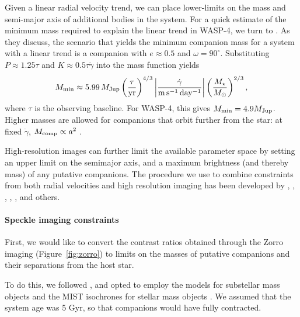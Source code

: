 \documentclass[12pt,twocolumn,tighten]{aastex62}
\begin{document}
Given a linear radial velocity trend, we can place lower-limits on the
mass and semi-major axis of additional bodies in the system.  For a
quick estimate of the minimum mass required to explain the linear
trend in WASP-4, we turn to \citet{feng_california_2015}.  As they
discuss, the scenario that yields the minimum companion mass for a
system with a linear trend is a companion with $e\approx0.5$ and
$\omega=90^\circ$.  Substituting $P\approx 1.25\tau$ and $K \approx
0.5\tau \dot{\gamma}$ into the mass function \citep[{\it
e.g.},][]{wright_efficient_2009} yields
\begin{equation}
 M_{\rm min} \approx 5.99\,M_{\rm Jup}
  \left( \frac{\tau}{{\rm yr}} \right)^{4/3}
  \left| \frac{\dot{\gamma}}{{\rm m\,s^{-1}\,day^{-1}}} \right|
  \left( \frac{M_\star}{{M_\odot}} \right)^{2/3},
\end{equation}
where $\tau$ is the observing baseline.  For WASP-4, this gives
$M_{\rm min} = 4.9 M_{\rm Jup}$.  Higher masses are allowed for
companions that orbit further from the star: at fixed $\dot{\gamma}$,
$M_{\rm comp} \propto a^2$
\citep{torres_substellar_1999,liu_crossing_2002}.

High-resolution images can further limit the available parameter space
by setting an upper limit on the semimajor axis, and a maximum
brightness (and thereby mass) of any putative companions.  The
procedure we use to combine constraints from both radial velocities
and high resolution imaging has been developed by
\citet{wright_linear_trends_2007}, \citet{crepp_trends_2012},
\citet{montet_trends_2014}, \citet{knutson_friends_2014},
\citet{bryan_statistics_2016,bryan_excess_2019}, and others.

\paragraph{Speckle imaging constraints}

First, we would like to convert the contrast ratios obtained through
the Zorro imaging (Figure~\ref{fig:zorro}) to limits on the masses of
putative companions and their separations from the host star.

To do this, we followed \citet{montet_trends_2014}, and opted to
employ the \citet{baraffe_evolutionary_2003} models for substellar
mass objects and the MIST isochrones for stellar mass objects
\citep{paxton_modules_2011,paxton_modules_2013,paxton_modules_2015,dotter_mesa_2016,choi_mesa_2016}.
We assumed that the system age was 5 Gyr, so that companions would
have fully contracted.
\end{document}
